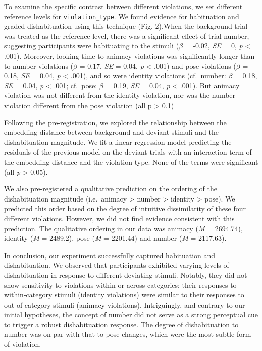 \documentclass[10pt, letterpaper]{article}
\begin{document}
To examine the specific contrast between different violations, we set
different reference levels for \texttt{violation\_type}. We found
evidence for habituation and graded dishabituation using this technique
(Fig. 2).When the background trial was treated as the reference level,
there was a significant effect of trial number, suggesting participants
were habituating to the stimuli (\(\beta\) = -0.02, \emph{SE} = 0,
\emph{p} \textless{} .001). Moreover, looking time to animacy violations
was significantly longer than to number violations (\(\beta\) = 0.17,
\emph{SE} = 0.04, \emph{p} \textless{} .001) and pose violations
(\(\beta\) = 0.18, \emph{SE} = 0.04, \emph{p} \textless{} .001), and so
were identity violations (cf.~number: \(\beta\) = 0.18, \emph{SE} =
0.04, \emph{p} \textless{} .001; cf.~pose: \(\beta\) = 0.19, \emph{SE} =
0.04, \emph{p} \textless{} .001). But animacy violation was not
different from the identity violation, nor was the number violation
different from the pose violation (all p \textgreater{} 0.1)

Following the pre-registration, we explored the relationship between the
embedding distance between background and deviant stimuli and the
dishabituation magnitude. We fit a linear regression model predicting
the residuals of the previous model on the deviant trials with an
interaction term of the embedding distance and the violation type. None
of the terms were significant (all \emph{p} \textgreater{} 0.05).

We also pre-registered a qualitative prediction on the ordering of the
dishabituation magnitude (i.e.~animacy \textgreater{} number
\textgreater{} identity \textgreater{} pose). We predicted this order
based on the degree of intuitive dissimilarity of these four different
violations. However, we did not find evidence consistent with this
prediction. The qualitative ordering in our data was animacy (\emph{M} =
2694.74), identity (\emph{M} = 2489.2), pose (\emph{M} = 2201.44) and
number (\emph{M} = 2117.63).

In conclusion, our experiment successfully captured habituation and
dishabituation. We observed that participants exhibited varying levels
of dishabituation in response to different deviating stimuli. Notably,
they did not show sensitivity to violations within or across categories;
their responses to within-category stimuli (identity violations) were
similar to their responses to out-of-category stimuli (animacy
violations). Intriguingly, and contrary to our initial hypotheses, the
concept of number did not serve as a strong perceptual cue to trigger a
robust dishabituation response. The degree of dishabituation to number
was on par with that to pose changes, which were the most subtle form of
violation.
\end{document}
